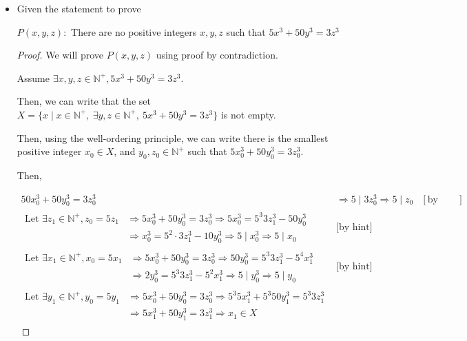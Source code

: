\documentclass[12pt]{article}
\begin{document}
\begin{itemize}
    \item

    Given the statement to prove

    \bigskip

    \begin{center}
        $P(x,y,z):$ There are no positive integers $x,y,z$ such that $5x^3 + 50y^3 = 3z^3$
    \end{center}

    \bigskip

    \begin{proof}
    We will prove $P(x,y,z)$ using proof by contradiction.

    \bigskip

    Assume $\exists x,y,z \in \mathbb{N}^+, 5x^3 + 50y^3 = 3z^3$.

    \bigskip

    Then, we can write that the set $X = \{x \mid x \in \mathbb{N}^+,\:\exists
    y,z \in \mathbb{N}^+,\:5x^3 + 50y^3 = 3z^3\}$ is not empty.

    \bigskip

    Then, using the well-ordering principle, we can write there is the smallest
    positive integer $x_0 \in X$, and $y_0,z_0 \in \mathbb{N}^+$ such that
    $5x_0^3 + 50y_0^3 = 3z_0^3$.

    \bigskip

    Then,

    \begin{align*}
        50x_0^3 + 50y_0^3 = 3z_0^3 &\Rightarrow 5 \mid 3z_0^3 \Rightarrow 5 \mid z_0 & [\text{by hint}]\\[1em]
        \begin{split}
        \text{Let $\exists z_1 \in \mathbb{N}^+$}, z_0 = 5z_1 &\Rightarrow 5x_0^3 + 50y_0^3 = 3z_0^3 \Rightarrow 5x_0^3 = 5^3 3z_1^3 - 50y_0^3 \\
        &\Rightarrow x_0^3 = 5^2 \cdot 3z_1^3 - 10y_0^3 \Rightarrow 5 \mid x_0^3 \Rightarrow 5 \mid x_0
        \end{split} & \text{[by hint]}\\[1em]
        \begin{split}
        \text{Let $\exists x_1 \in \mathbb{N}^+$}, x_0 = 5x_1 &\Rightarrow 5x_0^3 + 50y_0^3 = 3z_0^3 \Rightarrow 50y_0^3 = 5^3 3z_1^3 - 5^4x_1^3 \\
        &\Rightarrow 2y_0^3 = 5^3 3z_1^3 - 5^2x_1^3 \Rightarrow 5 \mid y_0^3 \Rightarrow 5 \mid y_0
        \end{split} & \text{[by hint]}\\[1em]
        \begin{split}
        \text{Let $\exists y_1 \in \mathbb{N}^+$}, y_0 = 5y_1 &\Rightarrow 5x_0^3 + 50y_0^3 = 3z_0^3 \Rightarrow 5^3 5x_1^3 + 5^3 50y_1^3 = 5^3 3z_1^3 \\
        &\Rightarrow 5x_1^3 + 50y_1^3 = 3z_1^3 \Rightarrow x_1 \in X
        \end{split}
    \end{align*}


\end{proof}
\end{itemize}
\end{document}
